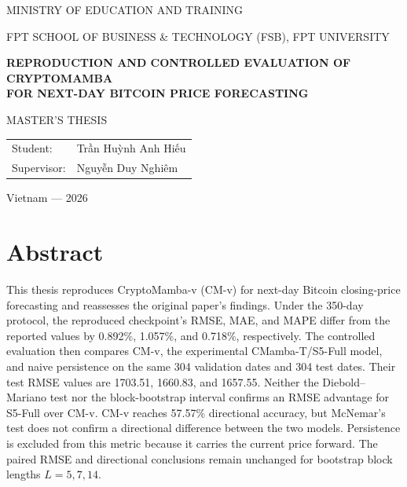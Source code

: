\documentclass[13pt,a4paper,oneside]{report}
\begin{document}
\sloppy

\begin{titlepage}
\centering
{\large MINISTRY OF EDUCATION AND TRAINING\par}
{\large FPT SCHOOL OF BUSINESS \& TECHNOLOGY (FSB), FPT UNIVERSITY\par}
\vfill
{\LARGE\bfseries REPRODUCTION AND CONTROLLED EVALUATION OF CRYPTOMAMBA\\[6pt]
FOR NEXT-DAY BITCOIN PRICE FORECASTING\par}
\vspace{10pt}
{\large MASTER'S THESIS\par}
\vfill
\begin{flushright}
\begin{tabular}{@{}ll@{}}
Student: & Trần Huỳnh Anh Hiếu \\
Supervisor: & Nguyễn Duy Nghiêm \\
\end{tabular}
\end{flushright}
\vfill
{\large Vietnam --- 2026\par}
\end{titlepage}


\chapter*{Abstract}
This thesis reproduces CryptoMamba-v (CM-v) for next-day Bitcoin closing-price forecasting and
reassesses the original paper's findings. Under the 350-day protocol, the reproduced checkpoint's
RMSE, MAE, and MAPE differ from the reported values by \num{0.892}\%, \num{1.057}\%, and
\num{0.718}\%, respectively. The controlled evaluation then compares CM-v, the experimental
CMamba-T/S5-Full model, and naive persistence on the same 304 validation dates and 304 test dates.
Their test RMSE values are \num{1703.51}, \num{1660.83}, and \num{1657.55}. Neither the
Diebold--Mariano test nor the block-bootstrap interval confirms an RMSE advantage for S5-Full over
CM-v. CM-v reaches \num{57.57}\% directional accuracy, but McNemar's test does not confirm a
directional difference between the two models. Persistence is excluded from this metric because it
carries the current price forward.
The paired RMSE and directional conclusions remain unchanged for bootstrap block lengths
$L=\num{5},\num{7},\num{14}$.
\end{document}
